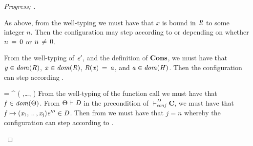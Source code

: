 \begin{proof}[Progress; ]
  \begin{eqncase}{
        \ottsym{=}   \IFZERO  {}  \THEN  {}  \ELSE  {} 
    }
    As above, from the well-typing we must have that $\mathit{x}$ is bound in $\mathit{R}$
    to some integer $n$. Then the configuration may step according to 
    or  depending on whether
    $n \, = \, 0$ or $n \, \neq \, 0$.
  \end{eqncase}
  
  \begin{eqncase}{
        \ottsym{=}     \WRITE  {}  \SEQ  {} 
    }
    From the well-typing of $\mathit{e'}$,
     and the definition
    of $\mathbf{Cons}$, we must have that $ \mathit{y}  \in   \mathit{dom}( \mathit{R} )  $,
    $ \mathit{x}  \in   \mathit{dom}( \mathit{R} )  $, $\mathit{R}  (  \mathit{x}  ) \, = \, \mathit{a}$, and $ \mathit{a}  \in   \mathit{dom}( \mathit{H} )  $. Then
    the configuration can step according .
  \end{eqncase}

  \begin{eqncase}{
        \ottsym{=}   \LET  {}  =    ^ \ell (   ,\ldots,   )   \IN  {} 
    }
    From the well-typing of the function call we must have that $ \mathit{f}  \in   \mathit{dom}( \Theta )  $.
    From $\Theta  \vdash  \mathit{D}$ in the precondition of $ \vdash_{\mathit{conf} }^D  \mathbf{C} $, we must have that
    $ \mathit{f}  \mapsto  (  \mathit{x_{{\mathrm{1}}}}  , \, .. \, ,  \mathit{x_{\mathit{j}}}  )  \mathit{e'''}  \in  \mathit{D} $. Then from  we must have that
    $ j = n $ whereby the configuration can step according to .
  \end{eqncase}
\end{proof}

